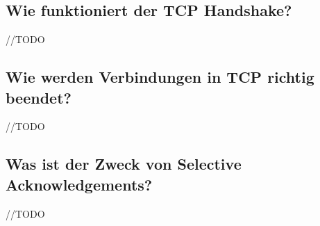 \subsection*{Wie funktioniert der TCP Handshake?}
//TODO
\subsection*{Wie werden Verbindungen in TCP richtig beendet?}
//TODO
\subsection*{Was ist der Zweck von \flqq{}Selective Acknowledgements\frqq?}
//TODO